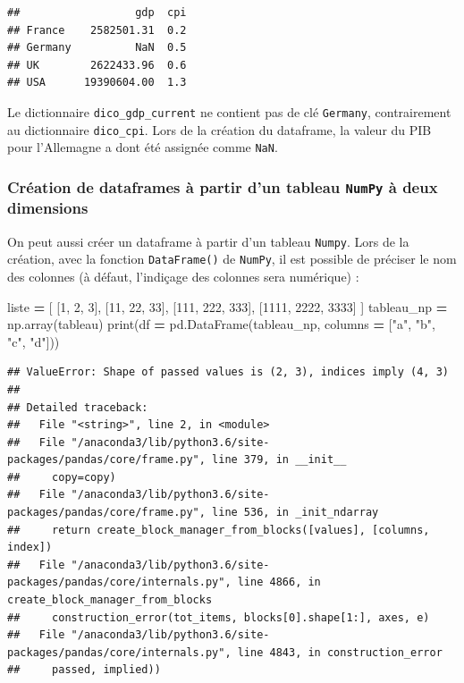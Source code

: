 \documentclass[12pt,]{book}
\newenvironment{Shaded}{\begin{snugshade}}{\end{snugshade}}
\newcommand{\DecValTok}[1]{\textcolor[rgb]{0.00,0.00,0.81}{#1}}
\newcommand{\StringTok}[1]{\textcolor[rgb]{0.31,0.60,0.02}{#1}}
\newcommand{\OperatorTok}[1]{\textcolor[rgb]{0.81,0.36,0.00}{\textbf{#1}}}
\newcommand{\BuiltInTok}[1]{#1}
\newcommand{\NormalTok}[1]{#1}
\numberwithin{equation}{section}
\numberwithin{countremarque}{section}
\let\BeginKnitrBlock\begin \let\EndKnitrBlock\end
\begin{document}
\begin{lstlisting}
##                  gdp  cpi
## France    2582501.31  0.2
## Germany          NaN  0.5
## UK        2622433.96  0.6
## USA      19390604.00  1.3
\end{lstlisting}

\BeginKnitrBlock{remarque}
Le dictionnaire \texttt{dico\_gdp\_current} ne contient pas de clé
\texttt{Germany}, contrairement au dictionnaire \texttt{dico\_cpi}. Lors
de la création du dataframe, la valeur du PIB pour l'Allemagne a dont
été assignée comme \texttt{NaN}.
\EndKnitrBlock{remarque}

\subsubsection{\texorpdfstring{Création de dataframes à partir d'un
tableau \texttt{NumPy} à deux
dimensions}{Création de dataframes à partir d'un tableau NumPy à deux dimensions}}\label{creation-de-dataframes-a-partir-dun-tableau-numpy-a-deux-dimensions}

On peut aussi créer un dataframe à partir d'un tableau \texttt{Numpy}.
Lors de la création, avec la fonction \texttt{DataFrame()} de
\texttt{NumPy}, il est possible de préciser le nom des colonnes (à
défaut, l'indiçage des colonnes sera numérique) :

\begin{Shaded}
\begin{Highlighting}[]
\NormalTok{liste }\OperatorTok{=}\NormalTok{ [}
\NormalTok{    [}\DecValTok{1}\NormalTok{, }\DecValTok{2}\NormalTok{, }\DecValTok{3}\NormalTok{],}
\NormalTok{    [}\DecValTok{11}\NormalTok{, }\DecValTok{22}\NormalTok{, }\DecValTok{33}\NormalTok{],}
\NormalTok{    [}\DecValTok{111}\NormalTok{, }\DecValTok{222}\NormalTok{, }\DecValTok{333}\NormalTok{],}
\NormalTok{    [}\DecValTok{1111}\NormalTok{, }\DecValTok{2222}\NormalTok{, }\DecValTok{3333}\NormalTok{]}
\NormalTok{]}
\NormalTok{tableau_np }\OperatorTok{=}\NormalTok{ np.array(tableau)}
\BuiltInTok{print}\NormalTok{(df }\OperatorTok{=}\NormalTok{ pd.DataFrame(tableau_np,}
\NormalTok{                  columns }\OperatorTok{=}\NormalTok{ [}\StringTok{"a"}\NormalTok{, }\StringTok{"b"}\NormalTok{, }\StringTok{"c"}\NormalTok{, }\StringTok{"d"}\NormalTok{]))}
\end{Highlighting}
\end{Shaded}

\begin{lstlisting}
## ValueError: Shape of passed values is (2, 3), indices imply (4, 3)
## 
## Detailed traceback: 
##   File "<string>", line 2, in <module>
##   File "/anaconda3/lib/python3.6/site-packages/pandas/core/frame.py", line 379, in __init__
##     copy=copy)
##   File "/anaconda3/lib/python3.6/site-packages/pandas/core/frame.py", line 536, in _init_ndarray
##     return create_block_manager_from_blocks([values], [columns, index])
##   File "/anaconda3/lib/python3.6/site-packages/pandas/core/internals.py", line 4866, in create_block_manager_from_blocks
##     construction_error(tot_items, blocks[0].shape[1:], axes, e)
##   File "/anaconda3/lib/python3.6/site-packages/pandas/core/internals.py", line 4843, in construction_error
##     passed, implied))
\end{lstlisting}
\end{document}
